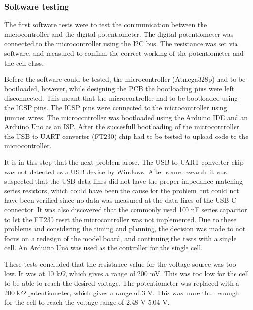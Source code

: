 \subsubsection{Software testing}
The first software tests were to test the communication between the microcontroller and the digital potentiometer. The digital potentiometer was connected to the microcontroller using the I2C bus. The resistance was set via software, and measured to confirm the correct working of the potentiometer and the cell class.

Before the software could be tested, the microcontroller (Atmega328p) had to be bootloaded, however, while designing the PCB the bootloading pins were left disconnected. This meant that the microcontroller had to be bootloaded using the ICSP pins. The ICSP pins were connected to the microcontroller using jumper wires. The microcontroller was bootloaded using the Arduino IDE and an Arduino Uno as an ISP. After the succesfull bootloading of the microcontroller the USB to UART converter (FT230) chip had to be tested to upload code to the microcontroller. 

It is in this step that the next problem arose. The USB to UART converter chip was not detected as a USB device by Windows. After some research it was suspected that the USB data lines did not have the proper impedance matching series resistors, which could have been the cause for the problem but could not have been verified since no data was measured at the data lines of the USB-C connector. It was also discovered that the commonly used 100 nF series capacitor to let the FT230 reset the microcontroller was not implemented. Due to these problems and considering the timing and planning, the decision was made to not focus on a redesign of the model board, and continuing the tests with a single cell. An Arduino Uno was used as the controller for the single cell.

These tests concluded that the resistance value for the voltage source was too low. It was at 10 k$\Omega$, which gives a range of 200 mV. This was too low for the cell to be able to reach the desired voltage. The potentiometer was replaced with a 200 k$\Omega$ potentiometer, which gives a range of 3 V. This was more than enough for the cell to reach the voltage range of 2.48 V-5.04 V.